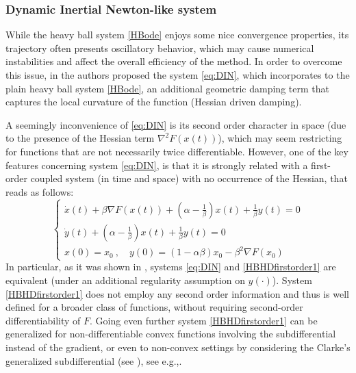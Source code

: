\documentclass[reqno]{amsart}
\theoremstyle{plain}
\theoremstyle{definition}
\theoremstyle{remark}
\newcommand{\eg}{e.g.,\xspace}	%
\begin{document}
\subsubsection{Dynamic Inertial Newton-like system}\label{subsection: DIN}
While the heavy ball system \eqref{HBode} enjoys some nice convergence properties, its trajectory often presents oscillatory behavior, which may cause numerical instabilities and affect the overall efficiency of the method.
In order to overcome this issue, in \cite{alvarez2002second} the authors proposed the system \eqref{eq:DIN}, which incorporates to the plain heavy ball system \eqref{HBode}, an additional geometric damping term that captures the local curvature of the function (Hessian driven damping).

A seemingly inconvenience of \eqref{eq:DIN} is its second order character in space (due to the presence of the Hessian term $\nabla^{2}F(x(t))$), which may seem restricting for functions that are not necessarily twice differentiable.
However, one of the key features concerning system \eqref{eq:DIN}, is that it is strongly related with a first-order coupled system (in time and space) with no occurrence of the Hessian, that reads as follows:
\begin{equation}
	\begin{cases}{}\label{HBHDfirstorder1}\tag{g-DIN}
		\dot{x}(t) +\beta\nabla F(x(t)) + \left(\alpha-\frac{1}{\beta}\right)x(t) + \frac{1}{\beta}y(t) = 0 \\
		\dot{y}(t) + \left(\alpha-\frac{1}{\beta}\right)x(t) + \frac{1}{\beta}y(t) = 0 \\
		x(0)=x_{0} ~ , \quad y(0)= (1-\alpha\beta)x_{0}  - \beta^{2}\nabla F(x_{0})
	\end{cases}
\end{equation}
In particular, as it was shown in \cite[Theorem $6.1$]{alvarez2002second}, systems \eqref{eq:DIN} and \eqref{HBHDfirstorder1} are equivalent (under an additional regularity assumption on $y(\cdot)$).
System \eqref{HBHDfirstorder1} does not employ any second order information and thus is well defined for a broader class of functions, without requiring second-order differentiability of $F$.
Going even further system \eqref{HBHDfirstorder1} can be generalized for non-differentiable convex functions involving the subdifferential instead of the gradient, or even to non-convex settings by considering the Clarke's generalized subdifferential (see \cite[Definition $10.3$]{clarke2013functional}), see \eg \cite{attouch2012second,castera2021inertial}.
\end{document}

